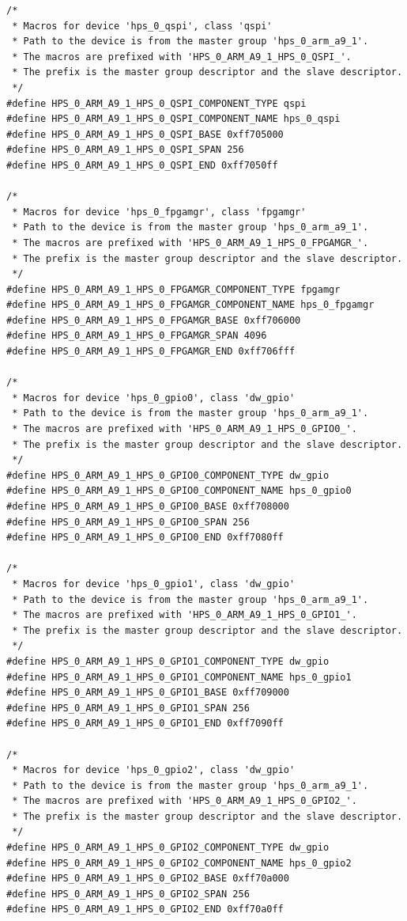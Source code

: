 \documentclass[conference]{IEEEtran}
\begin{document}
\begin{lstlisting}
/*
 * Macros for device 'hps_0_qspi', class 'qspi'
 * Path to the device is from the master group 'hps_0_arm_a9_1'.
 * The macros are prefixed with 'HPS_0_ARM_A9_1_HPS_0_QSPI_'.
 * The prefix is the master group descriptor and the slave descriptor.
 */
#define HPS_0_ARM_A9_1_HPS_0_QSPI_COMPONENT_TYPE qspi
#define HPS_0_ARM_A9_1_HPS_0_QSPI_COMPONENT_NAME hps_0_qspi
#define HPS_0_ARM_A9_1_HPS_0_QSPI_BASE 0xff705000
#define HPS_0_ARM_A9_1_HPS_0_QSPI_SPAN 256
#define HPS_0_ARM_A9_1_HPS_0_QSPI_END 0xff7050ff

/*
 * Macros for device 'hps_0_fpgamgr', class 'fpgamgr'
 * Path to the device is from the master group 'hps_0_arm_a9_1'.
 * The macros are prefixed with 'HPS_0_ARM_A9_1_HPS_0_FPGAMGR_'.
 * The prefix is the master group descriptor and the slave descriptor.
 */
#define HPS_0_ARM_A9_1_HPS_0_FPGAMGR_COMPONENT_TYPE fpgamgr
#define HPS_0_ARM_A9_1_HPS_0_FPGAMGR_COMPONENT_NAME hps_0_fpgamgr
#define HPS_0_ARM_A9_1_HPS_0_FPGAMGR_BASE 0xff706000
#define HPS_0_ARM_A9_1_HPS_0_FPGAMGR_SPAN 4096
#define HPS_0_ARM_A9_1_HPS_0_FPGAMGR_END 0xff706fff

/*
 * Macros for device 'hps_0_gpio0', class 'dw_gpio'
 * Path to the device is from the master group 'hps_0_arm_a9_1'.
 * The macros are prefixed with 'HPS_0_ARM_A9_1_HPS_0_GPIO0_'.
 * The prefix is the master group descriptor and the slave descriptor.
 */
#define HPS_0_ARM_A9_1_HPS_0_GPIO0_COMPONENT_TYPE dw_gpio
#define HPS_0_ARM_A9_1_HPS_0_GPIO0_COMPONENT_NAME hps_0_gpio0
#define HPS_0_ARM_A9_1_HPS_0_GPIO0_BASE 0xff708000
#define HPS_0_ARM_A9_1_HPS_0_GPIO0_SPAN 256
#define HPS_0_ARM_A9_1_HPS_0_GPIO0_END 0xff7080ff

/*
 * Macros for device 'hps_0_gpio1', class 'dw_gpio'
 * Path to the device is from the master group 'hps_0_arm_a9_1'.
 * The macros are prefixed with 'HPS_0_ARM_A9_1_HPS_0_GPIO1_'.
 * The prefix is the master group descriptor and the slave descriptor.
 */
#define HPS_0_ARM_A9_1_HPS_0_GPIO1_COMPONENT_TYPE dw_gpio
#define HPS_0_ARM_A9_1_HPS_0_GPIO1_COMPONENT_NAME hps_0_gpio1
#define HPS_0_ARM_A9_1_HPS_0_GPIO1_BASE 0xff709000
#define HPS_0_ARM_A9_1_HPS_0_GPIO1_SPAN 256
#define HPS_0_ARM_A9_1_HPS_0_GPIO1_END 0xff7090ff

/*
 * Macros for device 'hps_0_gpio2', class 'dw_gpio'
 * Path to the device is from the master group 'hps_0_arm_a9_1'.
 * The macros are prefixed with 'HPS_0_ARM_A9_1_HPS_0_GPIO2_'.
 * The prefix is the master group descriptor and the slave descriptor.
 */
#define HPS_0_ARM_A9_1_HPS_0_GPIO2_COMPONENT_TYPE dw_gpio
#define HPS_0_ARM_A9_1_HPS_0_GPIO2_COMPONENT_NAME hps_0_gpio2
#define HPS_0_ARM_A9_1_HPS_0_GPIO2_BASE 0xff70a000
#define HPS_0_ARM_A9_1_HPS_0_GPIO2_SPAN 256
#define HPS_0_ARM_A9_1_HPS_0_GPIO2_END 0xff70a0ff


\end{lstlisting}
\end{document}
